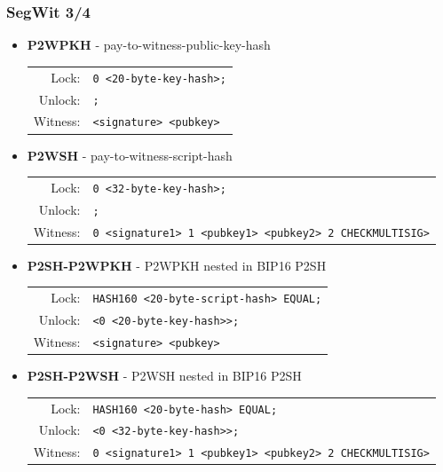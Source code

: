 \documentclass{beamer}
\begin{document}
\begin{frame}
  \frametitle{SegWit 3/4}
  \begin{itemize}
  \item \textbf{P2WPKH} - pay-to-witness-public-key-hash
    \break
    \begin{tabular}{rl}
      Lock: &\tiny\texttt{0 <20-byte-key-hash>;} \\
      Unlock: &\tiny\texttt{;} \\
      Witness: &\tiny\texttt{<signature> <pubkey>} \\
    \end{tabular}
  \item \textbf{P2WSH} - pay-to-witness-script-hash
    \break
    \begin{tabular}{rl}
      Lock: &\tiny\texttt{0 <32-byte-key-hash>;} \\
      Unlock: &\tiny\texttt{;} \\
      Witness: &\tiny\texttt{0 <signature1> 1 <pubkey1> <pubkey2> 2 CHECKMULTISIG>} \\
    \end{tabular}
  \item \textbf{P2SH-P2WPKH} - P2WPKH nested in BIP16 P2SH
    \break
    \begin{tabular}{rl}
      Lock: &\tiny\texttt{HASH160 <20-byte-script-hash> EQUAL;} \\
      Unlock: &\tiny\texttt{<0 <20-byte-key-hash>>;} \\
      Witness: &\tiny\texttt{<signature> <pubkey>} \\
    \end{tabular}
  \item \textbf{P2SH-P2WSH} - P2WSH nested in BIP16 P2SH
    \break
    \begin{tabular}{rl}
      Lock: &\tiny\texttt{HASH160 <20-byte-hash> EQUAL;} \\
      Unlock: &\tiny\texttt{<0 <32-byte-key-hash>>;} \\
      Witness: &\tiny\texttt{0 <signature1> 1 <pubkey1> <pubkey2> 2 CHECKMULTISIG>} \\
    \end{tabular}
  \end{itemize}
\end{frame}
\end{document}
